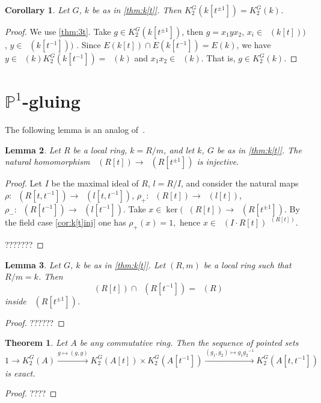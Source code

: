 \documentclass[oneside,12pt]{amsart}
\newtheorem{thm}{Theorem}
\numberwithin{equation}{section}
\newtheorem{lem}{Lemma}
\numberwithin{lem}{section}
\newtheorem{cor}[lem]{Corollary}
\theoremstyle{definition}
\theoremstyle{remark}
\DeclareMathOperator{\St}{St^G}
\newcommand{\Pro}{\mathbb{P}}
\newcommand{\st}{\scriptstyle}
\begin{document}
\begin{cor}
Let $G$, $k$ be as in \cref{thm:k[t]}. Then $K_2^G(k[t^{\pm 1}])=K_2^G(k)$.
\end{cor}
\begin{proof}
We use \cref{thm:3t}.
Take $g\in K_2^G(k[t^{\pm 1}])$,
then $g=x_1yx_2$, $x_i\in \St(k[t]))$, $y\in \St(k[t^{-1}]))$ .
Since $E(k[t])\cap E(k[t^{-1}])=E(k)$,
we have $y\in\St(k)K_2^G(k[t^{-1}])=\St(k)$ and $x_1x_2\in\St(k)$. That is, $g\in K_2^G(k)$.
\end{proof}

\section{$\Pro^1$-gluing}

The following lemma is an analog of~\cite[Proposition 4.3 (a)]{Tu}.

\begin{lem}
Let $R$ be a local ring, $k=R/m$, and let $k$, $G$ be as in \cref{thm:k[t]}.
The natural homomorphism $\St(R[t])\to\St(R[t^{\pm 1}])$ is injective.
\end{lem}
\begin{proof}
Let $I$ be the maximal ideal of $R$,
$l=R/I$, and consider the natural maps $\rho:\St(R[t,t^{-1}])\to \St(l[t,t^{-1}])$,
$\rho_+:\St(R[t])\to \St(l[t])$, $\rho_-:\St(R[t^{-1}])\to\St(l[t^{-1}])$.
Take $x\in \ker(\St(R[t])\to\St(R[t^{\pm 1}])$.
By the field case \cref{cor:k[t]inj} one has
$\rho_+(x)=1,$ hence $x\in\St(I\cdot R[t])^{\St(R[t])}$.

???????
\end{proof}

\begin{lem}
Let $G$, $k$ be as in \cref{thm:k[t]}.
Let $(R,m)$ be a local ring such that $R/m=k$.
Then
$$\St(R[t])\cap \St(R[t^{-1}])=\St(R)$$
inside $\St(R[t^{\pm 1}])$.
\end{lem}
\begin{proof}
??????
\end{proof}

\begin{thm}
Let $A$ be any commutative ring. Then the sequence of pointed sets
$$1\longrightarrow K_2^G(A)\xrightarrow{\st g\mapsto (g,g)} K_2^G(A[t])\times K_2^G(A[t^{-1}])
\xrightarrow{\st (g_1,g_2)\mapsto g_1{g_2}^{-1}} K_2^G(A[t,t^{-1}])$$
is exact.
\end{thm}
\begin{proof}
????
\end{proof}
\end{document}
